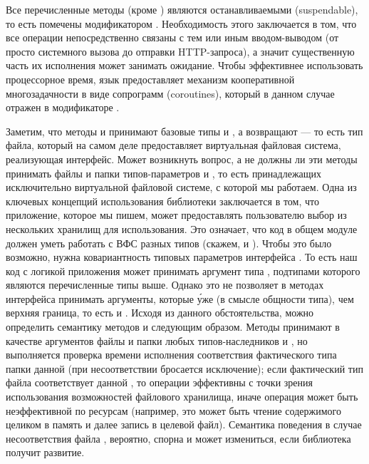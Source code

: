     Все перечисленные методы (кроме ) являются останавливаемыми \cite{kotlin-lang-coro-ru} (suspendable), то есть помечены модификатором . Необходимость этого заключается в том, что все операции непосредственно связаны с тем или иным вводом-выводом (от просто системного вызова до отправки HTTP-запроса), а значит существенную часть их исполнения может занимать ожидание. Чтобы эффективнее использовать процессорное время, язык предоставляет механизм кооперативной многозадачности в виде сопрограмм (coroutines), который в данном случае отражен в модификаторе . 

    Заметим, что методы  и  принимают базовые типы  и , а возвращают  --- то есть тип файла, который на самом деле предоставляет виртуальная файловая система, реализующая интерфейс. Может возникнуть вопрос, а не должны ли эти методы принимать файлы и папки типов-параметров  и , то есть принадлежащих исключительно виртуальной файловой системе, с которой мы работаем. Одна из ключевых концепций использования библиотеки заключается в том, что приложение, которое мы пишем, может предоставлять пользователю выбор из нескольких хранилищ для использования. Это означает, что код в общем модуле должен уметь работать с ВФС разных типов (скажем,  и ). Чтобы это было возможно, нужна ковариантность\cite{kotlin-generics} типовых параметров интерфейса . То есть наш код с логикой приложения может принимать аргумент типа , подтипами которого являются перечисленные типы выше. Однако это не позволяет в методах интерфейса  принимать аргументы, которые \'{у}же (в смысле общности типа), чем верхняя граница, то есть  и . Исходя из данного обстоятельства, можно определить семантику методов  и  следующим образом. Методы принимают в качестве аргументов файлы и папки любых типов-наследников  и , но выполняется проверка времени исполнения соответствия фактического типа папки данной  (при несоответствии бросается исключение); если фактический тип файла соответствует данной , то операции эффективны с точки зрения использования возможностей файлового хранилища, иначе операция может быть неэффективной по ресурсам (например, это может быть чтение содержимого целиком в память и далее запись в целевой файл). Семантика поведения в случае несоответствия файла , вероятно, спорна и может измениться, если библиотека получит развитие.
    
